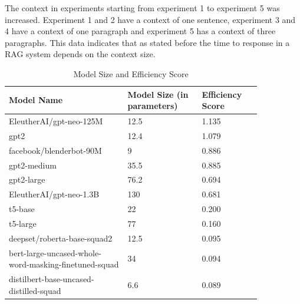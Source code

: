 \documentclass{wseas}
\begin{document}
The context in experiments starting from experiment 1 to experiment 5 was increased. Experiment 1 and 2 have a context of one sentence, experiment 3 and 4 have a context of one paragraph and experiment 5 has a context of three paragraphs.
This data indicates that as stated before the time to response in a RAG system depends on the context size.

\begin{table}[htbp]
  \centering
  \caption{Model Size and Efficiency Score} %
  \label{tab:model_efficiency_scores}  %
  \begin{tabular}
    {|p{0.4\linewidth}|p{0.25\linewidth}|p{0.2\linewidth}|}
    \hline
    \textbf{Model Name} & \textbf{Model Size (in parameters)} & \textbf{Efficiency Score} \\
    \hline
    EleutherAI/gpt-neo-125M & 12.5 & 1.135 \\
    \hline
    gpt2 & 12.4 & 1.079 \\
    \hline
    facebook/blenderbot-90M & 9 & 0.886 \\
    \hline
    gpt2-medium & 35.5 & 0.885 \\
    \hline
    gpt2-large & 76.2 & 0.694 \\
    \hline
    EleutherAI/gpt-neo-1.3B & 130 & 0.681 \\
    \hline
    t5-base & 22 & 0.200 \\
    \hline
    t5-large & 77 & 0.160 \\
    \hline
    deepset/roberta-base-squad2 & 12.5 & 0.095 \\
    \hline
    bert-large-uncased-whole-word-masking-finetuned-squad & 34 & 0.094 \\
    \hline
    distilbert-base-uncased-distilled-squad & 6.6 & 0.089 \\
    \hline
  \end{tabular}
\end{table}
\end{document}
